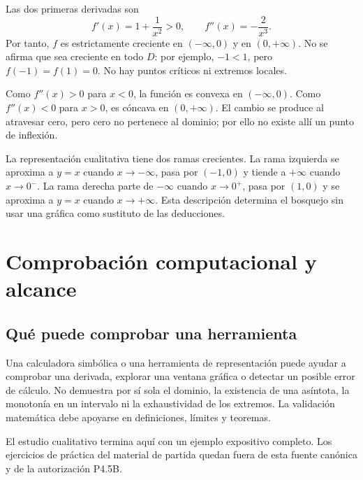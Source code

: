 Las dos primeras derivadas son
\[
  f'(x)=1+\frac1{x^2}>0,
  \qquad
  f''(x)=-\frac2{x^3}.
\]
Por tanto, \(f\) es estrictamente creciente en \(( -\infty,0)\) y en
\((0,+\infty)\). No se afirma que sea creciente en todo \(D\): por ejemplo,
\(-1<1\), pero \(f(-1)=f(1)=0\). No hay puntos críticos ni extremos locales.

Como \(f''(x)>0\) para \(x<0\), la función es convexa en
\(( -\infty,0)\). Como \(f''(x)<0\) para \(x>0\), es cóncava en
\((0,+\infty)\). El cambio se produce al atravesar cero, pero cero no
pertenece al dominio; por ello no existe allí un punto de inflexión.

La representación cualitativa tiene dos ramas crecientes. La rama izquierda
se aproxima a \(y=x\) cuando \(x\to-\infty\), pasa por \((-1,0)\) y tiende a
\(+\infty\) cuando \(x\to0^-\). La rama derecha parte de \(-\infty\) cuando
\(x\to0^+\), pasa por \((1,0)\) y se aproxima a \(y=x\) cuando
\(x\to+\infty\). Esta descripción determina el bosquejo sin usar una gráfica
como sustituto de las deducciones.

\section{Comprobación computacional y alcance}
\label{sec:comprobacion-computacional}

\subsection{Qué puede comprobar una herramienta}

Una calculadora simbólica o una herramienta de representación puede ayudar a
comprobar una derivada, explorar una ventana gráfica o detectar un posible
error de cálculo. No demuestra por sí sola el dominio, la existencia de una
asíntota, la monotonía en un intervalo ni la exhaustividad de los extremos.
La validación matemática debe apoyarse en definiciones, límites y teoremas.

El estudio cualitativo termina aquí con un ejemplo expositivo completo. Los
ejercicios de práctica del material de partida quedan fuera de esta fuente
canónica y de la autorización P4.5B.
